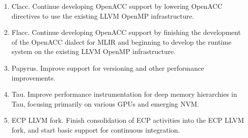 \begin{enumerate}
	\item Clacc. Continue developing OpenACC support by lowering OpenACC directives to use the existing LLVM OpenMP infrastructure.
    
    \item Flacc. Continue developing OpenACC support by finishing the development of the  OpenACC dialect for MLIR and beginning to develop the runtime system on the existing LLVM OpenMP infrastructure.
    
	\item Papyrus. Improve support for versioning and other performance improvements.
    
    \item Tau. Improve performance instrumentation for deep memory hierarchies in Tau, focusing primarily on various GPUs and emerging NVM.
    
    \item ECP LLVM fork. Finish consolidation of ECP activities into the ECP LLVM fork, and start basic support for continuous integration.

\end{enumerate}

